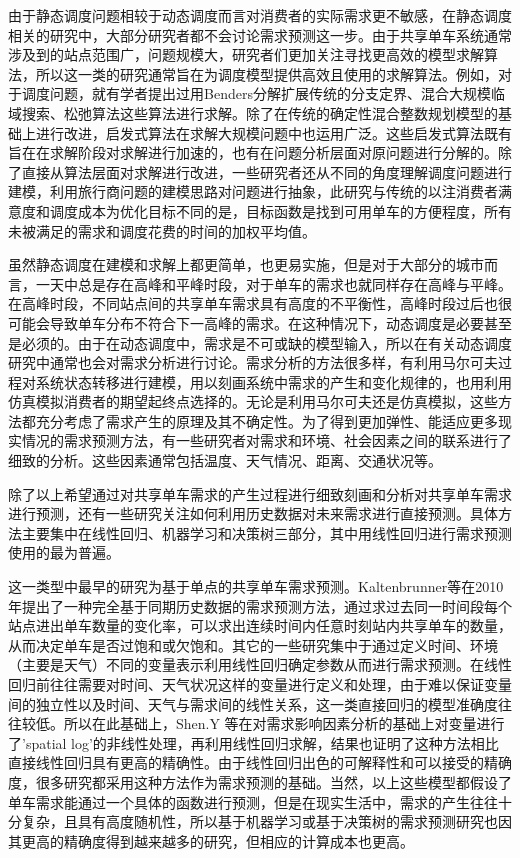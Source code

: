 \documentclass[]{tongjithesis}
\numberwithin{equation}{chapter}
\begin{document}
由于静态调度问题相较于动态调度而言对消费者的实际需求更不敏感，在静态调度相关的研究中，大部分研究者都不会讨论需求预测这一步。由于共享单车系统通常涉及到的站点范围广，问题规模大，研究者们更加关注寻找更高效的模型求解算法，所以这一类的研究通常旨在为调度模型提供高效且使用的求解算法。例如，对于调度问题，就有学者提出过用Benders分解扩展传统的分支定界\cite{erdougan2015exact}、混合大规模临域搜索\cite{pal2017free}、松弛算法\cite{chemla2013bike}这些算法进行求解。除了在传统的确定性混合整数规划模型的基础上进行改进，启发式算法在求解大规模问题中也运用广泛\cite{ho2014solving,forma20153}。这些启发式算法既有旨在在求解阶段对求解进行加速的，也有在问题分析层面对原问题进行分解的。除了直接从算法层面对求解进行改进，一些研究者还从不同的角度理解调度问题进行建模，利用旅行商问题的建模思路对问题进行抽象\cite{chemla2013bike}，此研究与传统的以注消费者满意度和调度成本为优化目标不同的是，目标函数是找到可用单车的方便程度，所有未被满足的需求和调度花费的时间的加权平均值。

虽然静态调度在建模和求解上都更简单，也更易实施，但是对于大部分的城市而言，一天中总是存在高峰和平峰时段，对于单车的需求也就同样存在高峰与平峰。在高峰时段，不同站点间的共享单车需求具有高度的不平衡性，高峰时段过后也很可能会导致单车分布不符合下一高峰的需求。在这种情况下，动态调度是必要甚至是必须的。由于在动态调度中，需求是不可或缺的模型输入，所以在有关动态调度研究中通常也会对需求分析进行讨论。需求分析的方法很多样，有利用马尔可夫过程对系统状态转移进行建模，用以刻画系统中需求的产生和变化规律的\cite{schuijbroek2017inventory}，也用利用仿真模拟消费者的期望起终点选择的\cite{caggiani2013dynamic}。无论是利用马尔可夫还是仿真模拟，这些方法都充分考虑了需求产生的原理及其不确定性。为了得到更加弹性、能适应更多现实情况的需求预测方法，有一些研究者对需求和环境、社会因素之间的联系进行了细致的分析。这些因素通常包括温度、天气情况、距离、交通状况等\cite{frade2014bicycle,faghih2014land}。

除了以上希望通过对共享单车需求的产生过程进行细致刻画和分析对共享单车需求进行预测，还有一些研究关注如何利用历史数据对未来需求进行直接预测。具体方法主要集中在线性回归、机器学习和决策树三部分，其中用线性回归进行需求预测使用的最为普遍。

这一类型中最早的研究为基于单点的共享单车需求预测。Kaltenbrunner等在2010年提出了一种完全基于同期历史数据的需求预测方法\cite{kaltenbrunner2010urban}，通过求过去同一时间段每个站点进出单车数量的变化率，可以求出连续时间内任意时刻站内共享单车的数量，从而决定单车是否过饱和或欠饱和。其它的一些研究集中于通过定义时间、环境（主要是天气）不同的变量表示利用线性回归确定参数从而进行需求预测。在线性回归前往往需要对时间、天气状况这样的变量进行定义和处理，由于难以保证变量间的独立性以及时间、天气与需求间的线性关系，这一类直接回归的模型准确度往往较低。所以在此基础上，Shen.Y 等在对需求影响因素分析的基础上对变量进行了’spatial log’的非线性处理，再利用线性回归求解，结果也证明了这种方法相比直接线性回归具有更高的精确性\cite{shen2018understanding}。由于线性回归出色的可解释性和可以接受的精确度，很多研究都采用这种方法作为需求预测的基础。当然，以上这些模型都假设了单车需求能通过一个具体的函数进行预测，但是在现实生活中，需求的产生往往十分复杂，且具有高度随机性，所以基于机器学习\cite{xu2020hybrid}或基于决策树\cite{ve2020rule}的需求预测研究也因其更高的精确度得到越来越多的研究，但相应的计算成本也更高。
\end{document}
